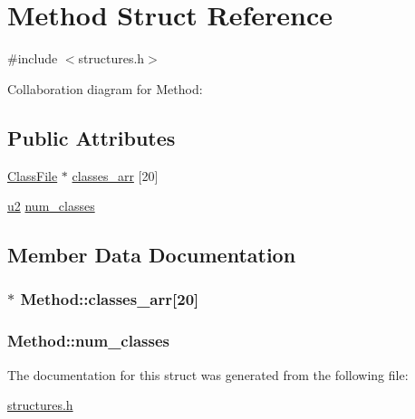 \hypertarget{structMethod}{}\section{Method Struct Reference}
\label{structMethod}


{\ttfamily \#include $<$structures.\+h$>$}



Collaboration diagram for Method\+:
\subsection*{Public Attributes}
\begin{DoxyCompactItemize}
\item 
\hyperlink{structClassFile}{Class\+File} $\ast$ \hyperlink{structMethod_ace741cd234df7db5849ee2af75870b8c}{classes\+\_\+arr} \mbox{[}20\mbox{]}
\item 
\hyperlink{structures_8h_a55ef8d87fd202b8417704c089899c5b9}{u2} \hyperlink{structMethod_a40dccf4ca5a8d3a74798917a888be720}{num\+\_\+classes}
\end{DoxyCompactItemize}


\subsection{Member Data Documentation}
\subsubsection[{\texorpdfstring{classes\+\_\+arr}{classes_arr}}]{$\ast$ Method\+::classes\+\_\+arr\mbox{[}20\mbox{]}}\hypertarget{structMethod_ace741cd234df7db5849ee2af75870b8c}{}\label{structMethod_ace741cd234df7db5849ee2af75870b8c}
\subsubsection[{\texorpdfstring{num\+\_\+classes}{num_classes}}]{ Method\+::num\+\_\+classes}\hypertarget{structMethod_a40dccf4ca5a8d3a74798917a888be720}{}\label{structMethod_a40dccf4ca5a8d3a74798917a888be720}


The documentation for this struct was generated from the following file\+:\begin{DoxyCompactItemize}
\item 
\hyperlink{structures_8h}{structures.\+h}\end{DoxyCompactItemize}
